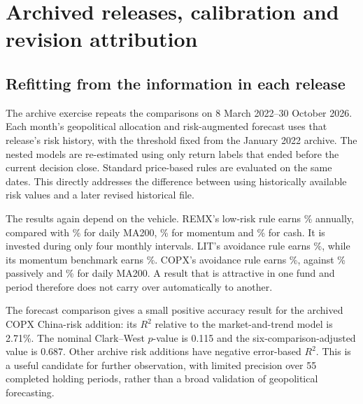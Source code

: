 \section{Archived releases, calibration and revision attribution}
\subsection{Refitting from the information in each release}

The archive exercise repeats the comparisons on 8 March 2022–30 October 2026. Each month's geopolitical allocation and risk-augmented forecast uses that release's risk history, with the threshold fixed from the January 2022 archive. The nested models are re-estimated using only return labels that ended before the current decision close. Standard price-based rules are evaluated on the same dates. This directly addresses the difference between using historically available risk values and a later revised historical file.

\begin{table}[!htbp]
\centering\small
\caption{Net annualised returns using archived GPR releases, 2022–2026}
\label{tab:archive}

\end{table}

The results again depend on the vehicle. REMX's low-risk rule earns \ArcRemxLowCagr\% annually, compared with \ArcRemxDailyMACagr\% for daily MA200, \ArcRemxMomentumCagr\% for momentum and \ArcRemxCashCagr\% for cash. It is invested during only four monthly intervals. LIT's avoidance rule earns \ArcLitAvoidCagr\%, while its momentum benchmark earns \ArcLitMomentumCagr\%. COPX's avoidance rule earns \ArcCopxAvoidCagr\%, against \ArcCopxPassiveCagr\% passively and \ArcCopxDailyMACagr\% for daily MA200. A result that is attractive in one fund and period therefore does not carry over automatically to another.

The forecast comparison gives a small positive accuracy result for the archived COPX China-risk addition: its $R^2$ relative to the market-and-trend model is 2.71\%. The nominal Clark–West $p$-value is 0.115 and the six-comparison-adjusted value is 0.687. Other archive risk additions have negative error-based $R^2$. This is a useful candidate for further observation, with limited precision over 55 completed holding periods, rather than a broad validation of geopolitical forecasting.

